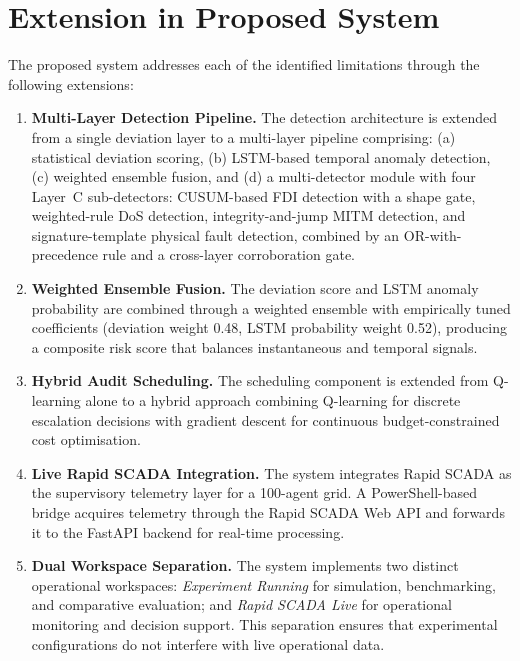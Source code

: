\section{Extension in Proposed System}

The proposed system addresses each of the identified limitations through the following extensions:

\begin{enumerate}
    \item \textbf{Multi-Layer Detection Pipeline.} The detection architecture is extended from a single deviation layer to a multi-layer pipeline comprising: (a) statistical deviation scoring, (b) LSTM-based temporal anomaly detection, (c) weighted ensemble fusion, and (d) a multi-detector module with four Layer~C sub-detectors: CUSUM-based FDI detection with a shape gate, weighted-rule DoS detection, integrity-and-jump MITM detection, and signature-template physical fault detection, combined by an OR-with-precedence rule and a cross-layer corroboration gate.

    \item \textbf{Weighted Ensemble Fusion.} The deviation score and LSTM anomaly probability are combined through a weighted ensemble with empirically tuned coefficients (deviation weight 0.48, LSTM probability weight 0.52), producing a composite risk score that balances instantaneous and temporal signals.

    \item \textbf{Hybrid Audit Scheduling.} The scheduling component is extended from Q-learning alone to a hybrid approach combining Q-learning for discrete escalation decisions with gradient descent for continuous budget-constrained cost optimisation.

    \item \textbf{Live Rapid SCADA Integration.} The system integrates Rapid SCADA as the supervisory telemetry layer for a 100-agent grid. A PowerShell-based bridge acquires telemetry through the Rapid SCADA Web API and forwards it to the FastAPI backend for real-time processing.

    \item \textbf{Dual Workspace Separation.} The system implements two distinct operational workspaces: \textit{Experiment Running} for simulation, benchmarking, and comparative evaluation; and \textit{Rapid SCADA Live} for operational monitoring and decision support. This separation ensures that experimental configurations do not interfere with live operational data.


\end{enumerate}
